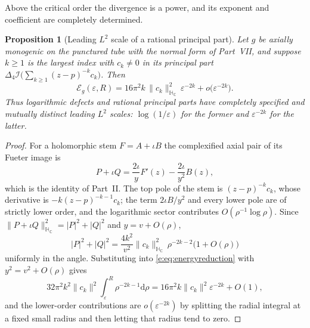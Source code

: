 \documentclass[11pt,a4paper]{article}
\numberwithin{equation}{section}
\newtheorem{proposition}[theorem]{Proposition}
\theoremstyle{definition}
\theoremstyle{remark}
\theoremstyle{plain}
\newcommand{\HC}{\mathbb H_{\mathbb C}}
\newcommand{\lap}{\Delta_4}
\newcommand{\I}{\mathcal I}
\newcommand{\Eg}{\mathcal E_{g}}
\newcommand{\abs}[1]{\lvert #1\rvert}
\newcommand{\norm}[1]{\lVert #1\rVert}
\newcommand{\dd}{\mathrm d}
\begin{document}
Above the critical order the divergence is a power, and its exponent and
coefficient are completely determined.

\begin{proposition}[Leading $L^2$ scale of a rational principal part]
\label{e:prop:poleenergy}
Let $g$ be axially monogenic on the punctured tube with the normal form
of Part~VII, and suppose $k\ge1$ is the largest index with $c_k\ne0$ in
its principal part $\lap\I\bigl(\sum_{k\ge1}(z-p)^{-k}c_k\bigr)$. Then
\begin{equation}
 \Eg(\varepsilon,R)
 =16\pi^2k\,\norm{c_k}_{\HC}^2\,\varepsilon^{-2k}
      +o\bigl(\varepsilon^{-2k}\bigr).
 \label{e:eq:poleenergy}
\end{equation}
Thus logarithmic defects and rational principal parts have completely
specified and mutually distinct leading $L^2$ scales: $\log(1/\varepsilon)$
for the former and $\varepsilon^{-2k}$ for the latter.
\end{proposition}

\begin{proof}
For a holomorphic stem $F=A+\iota B$ the complexified axial pair of its
Fueter image is
\begin{equation}
 P+\iota Q=\frac{2\iota}{y}F'(z)-\frac{2\iota}{y^2}B(z),
 \label{e:eq:complexified-fueter}
\end{equation}
which is the identity of Part~II. The top pole of the stem is
$(z-p)^{-k}c_k$, whose derivative is $-k(z-p)^{-k-1}c_k$; the term
$2\iota B/y^2$ and every lower pole are of strictly lower order, and the
logarithmic sector contributes $O(\rho^{-1}\log\rho)$. Since
$\norm{P+\iota Q}_{\HC}^2=\abs P^2+\abs Q^2$ and $y=v+O(\rho)$,
\[
 \abs P^2+\abs Q^2
 =\frac{4k^2}{v^2}\norm{c_k}_{\HC}^2\,\rho^{-2k-2}\bigl(1+O(\rho)\bigr)
\]
uniformly in the angle. Substituting into \eqref{e:eq:energyreduction}
with $y^2=v^2+O(\rho)$ gives
\[
 32\pi^2k^2\norm{c_k}^2\int_\varepsilon^R\rho^{-2k-1}\dd\rho
 =16\pi^2k\norm{c_k}^2\varepsilon^{-2k}+O(1),
\]
and the lower-order contributions are $o(\varepsilon^{-2k})$ by splitting
the radial integral at a fixed small radius and then letting that radius
tend to zero.
\end{proof}
\end{document}
